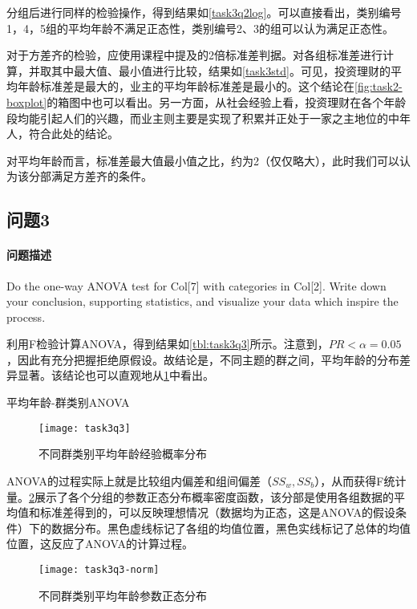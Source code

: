 \documentclass[a4paper,12pt]{article}
\begin{document}
    分组后进行同样的检验操作，得到结果如\cref{task3q2log}。可以直接看出，类别编号1，4，5组的平均年龄不满足正态性，类别编号2、3的组可以认为满足正态性。
    

    对于方差齐的检验，应使用课程中提及的2倍标准差判据\cite{anova}。对各组标准差进行计算，并取其中最大值、最小值进行比较，结果如\cref{task3std}。可见，投资理财的平均年龄标准差是最大的，业主的平均年龄标准差是最小的。这个结论在\cref{fig:task2-boxplot}的箱图中也可以看出。另一方面，从社会经验上看，投资理财在各个年龄段均能引起人们的兴趣，而业主则主要是实现了积累并正处于一家之主地位的中年人，符合此处的结论。
    

    对平均年龄而言，标准差最大值最小值之比，约为2（仅仅略大），此时我们可以认为该分部满足方差齐的条件。

    \subsection{问题3}
    \paragraph{问题描述} Do the one-way ANOVA test for Col[7] with categories in Col[2]. Write down your conclusion, supporting statistics, and visualize your data which inspire the process.

    利用F检验计算ANOVA，得到结果如\cref{tbl:task3q3}所示。注意到，$PR<\alpha=0.05$，因此有充分把握拒绝原假设。故结论是，不同主题的群之间，平均年龄的分布差异显著。该结论也可以直观地从\cref{fig:task3q3}中看出。
    \begin{table}
      \centering
      \caption{平均年龄-群类别ANOVA}
      \label{tbl:task3q3}
      
    \end{table}
    \begin{figure}
      \centering
      \texttt{[image: task3q3]}
      \caption{不同群类别平均年龄经验概率分布}
      \label{fig:task3q3}
    \end{figure}

    ANOVA的过程实际上就是比较组内偏差和组间偏差（$SS_w, SS_b$），从而获得F统计量。\cref{fig:task3q3-norm}展示了各个分组的参数正态分布概率密度函数，该分部是使用各组数据的平均值和标准差得到的，可以反映理想情况（数据均为正态，这是ANOVA的假设条件）下的数据分布。黑色虚线标记了各组的均值位置，黑色实线标记了总体的均值位置，这反应了ANOVA的计算过程。
    \begin{figure}
      \centering
      \texttt{[image: task3q3-norm]}
      \caption{不同群类别平均年龄参数正态分布}
      \label{fig:task3q3-norm}
    \end{figure}
\end{document}

